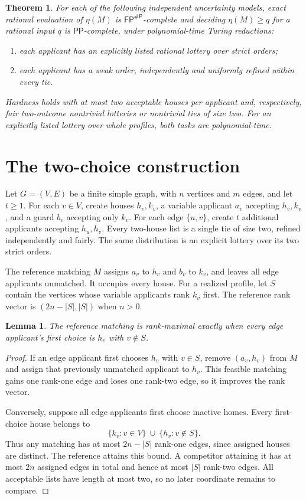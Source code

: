 \documentclass[10pt]{article}
\newtheorem{theorem}{Theorem}
\newtheorem{lemma}{Lemma}
\newcommand{\FP}{\mathsf{FP}}
\newcommand{\PP}{\mathsf{PP}}
\newcommand{\sharpP}{\mathsf{\#P}}
\begin{document}
\begin{theorem}\label{thm:main}
For each of the following independent uncertainty models, exact rational
evaluation of $\eta(M)$ is $\FP^{\sharpP}$-complete and deciding
$\eta(M)\geq q$ for a rational input $q$ is $\PP$-complete, under
polynomial-time Turing reductions:
\begin{enumerate}
\item each applicant has an explicitly listed rational lottery over strict
orders;
\item each applicant has a weak order, independently and uniformly refined
within every tie.
\end{enumerate}
Hardness holds with at most two acceptable houses per applicant and,
respectively, fair two-outcome nontrivial lotteries or nontrivial ties
of size two. For an
explicitly listed lottery over whole profiles, both tasks are polynomial-time.
\end{theorem}

\section*{The two-choice construction}
Let $G=(V,E)$ be a finite simple graph, with $n$ vertices and $m$ edges,
and let $t\geq1$. For each $v\in V$, create houses $h_v,k_v$, a variable
applicant $a_v$ accepting $h_v,k_v$, and a guard $b_v$ accepting only $k_v$.
For each edge $\{u,v\}$, create $t$ additional applicants accepting
$h_u,h_v$. Every two-house list is a single tie of size two, refined
independently and fairly. The same distribution is an explicit lottery
over its two strict orders.

The reference matching $M$ assigns $a_v$ to $h_v$ and $b_v$ to $k_v$,
and leaves all edge applicants unmatched. It occupies every house.
For a realized profile, let $S$ contain the vertices whose variable
applicants rank $k_v$ first. The reference rank vector is
$(2n-|S|,|S|)$ when $n>0$.

\begin{lemma}\label{lem:criterion}
The reference matching is rank-maximal exactly when every edge
applicant's first choice is $h_v$ with $v\notin S$.
\end{lemma}
\begin{proof}
If an edge applicant first chooses $h_v$ with $v\in S$, remove
$(a_v,h_v)$ from $M$ and assign that previously unmatched applicant
to $h_v$. This feasible matching gains one rank-one edge and loses
one rank-two edge, so it improves the rank vector.

Conversely, suppose all edge applicants first choose inactive homes.
Every first-choice house belongs to
\[
 \{k_v:v\in V\}\ \cup\ \{h_v:v\notin S\}.
\]
Thus any matching has at most $2n-|S|$ rank-one edges, since assigned
houses are distinct. The reference attains this bound. A competitor
attaining it has at most $2n$ assigned edges in total and hence at most
$|S|$ rank-two edges. All acceptable lists have length at most two,
so no later coordinate remains to compare.
\end{proof}
\end{document}

